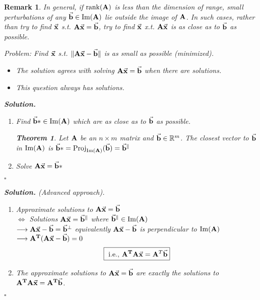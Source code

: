 \documentclass[12pt, a4paper]{article}
\newtheorem{thm}{Theorem}[subsection]
\newtheorem*{rmk}{\indent Remark}
\newenvironment*{sol}{\par\indent\textbf{\textit{Solution. }}}{\hfill{$\square$}\par}
\def\R{{\mathbb{R}}}
\def\T{{\vb{T}}}
\def\IM{{\mathrm{Im}}}
\def\rank{\mathrm{rank}}
\def\Proj{\mathrm{Proj}}
\def\vecx{\va{x}}
\def\vecb{\va{b}}
\def\matrixA{\vb{A}}
\begin{document}
\begin{rmk}
	In general, if $\rank(\matrixA)$ is less than the dimension of range, small perturbations of any $\vecb\in\IM(\matrixA)$ lie outside the image of $\matrixA$. In such cases, rather than try to find $\vecx$ \emph{s.t.} $\matrixA\vecx=\vecb$, try to find $\vecx$ \emph{x.t.} $\matrixA\vecx$ is as close as to $\vecb$ as possible. 	
	\begin{framed}
		Problem: Find $\vecx$ \emph{s.t.} $\|\matrixA\vecx-\vecb\|$ is as small as possible (minimized).
		\begin{itemize}
			\item The solution agrees with solving $\matrixA\vecx=\vecb$ when there are solutions.
			\item This question always has solutions.
		\end{itemize}	
	\end{framed}
	\begin{sol}
		\begin{enumerate}
			\item Find $\vecb*\in\IM(\matrixA)$ which are as close as to $\vecb$ as possible. \\
			\begin{thm} Let $\matrixA$ be an $n\times m$ matrix and $\vecb\in\R^m$. The closest vector to $\vecb$ in $\IM(\matrixA)$ is $\vecb*=\Proj_{\IM(\matrixA)}(\vecb)=\vecb^\parallel$ \end{thm}
			\item Solve $\matrixA\vecx=\vecb*$
		\end{enumerate}
	\end{sol}
	\begin{sol}(Advanced approach).
		\begin{enumerate}
			\item Approximate solutions to 	$\matrixA\vecx=\vecb$\\$\Longleftrightarrow$ Solutions $\matrixA\vecx=\vecb^\parallel$ where $\vecb^\parallel\in\IM(\matrixA)$\\$\longrightarrow\matrixA\vecx-\vecb=\vecb^\perp$ equivalently $\matrixA\vecx-\vecb$ is perpendicular to $\IM(\matrixA)$\\$\longrightarrow\matrixA^\T(\matrixA\vecx-\vecb)=0$\[\boxed{\text{ i.e., }\matrixA^\T\matrixA\vecx=\matrixA^T\vecb}\]
			\item The approximate solutions to $\matrixA\vecx=\vecb$ are exactly the solutions to $\matrixA^\T\matrixA\vecx=\matrixA^\T\vecb$.
		\end{enumerate}
	\end{sol}

\end{rmk}
\end{document}
